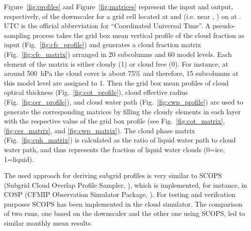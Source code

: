 Figure~\ref{fig:profiles} and Figure~\ref{fig:matrices} 
represent the input and output, respectively, of the downscaler
for a grid cell located at {\longitude} and {\latitude} (i.e. near {\gccity}, {\gcland})
on {\gcdate} at {\gchour}. UTC is the official abbreviation for ``Coordinated Universal Time''.
A pseudo-sampling process takes the grid box mean vertical profile of the cloud fraction as input 
(Fig.~\ref{fig:cfc_profile}) and generates a cloud fraction matrix 
(Fig.~\ref{fig:cfc_matrix}) arranged in 20 subcolumns and 60 model levels.
Each element of the matrix is either cloudy (1) or cloud free (0).
For instance, at around 500~hPa the cloud cover is about 75\% and therefore,
15 subcolumns at this model level are assigned to 1.
Then the grid box mean profiles of cloud optical thickness (Fig.~\ref{fig:cot_profile}),
cloud effective radius (Fig.~\ref{fig:cer_profile}), 
and cloud water path (Fig.~\ref{fig:cwp_profile}) are used
to generate the corresponding matrices by filling the cloudy elements
in each layer with the respective value of the grid box profile 
(see Fig.~\ref{fig:cot_matrix}, \ref{fig:cer_matrix}, and \ref{fig:cwp_matrix}).
The cloud phase matrix (Fig.~\ref{fig:cph_matrix}) is calculated as the ratio
of liquid water path to cloud water path, and thus represents 
the fraction of liquid water clouds (0=ice, 1=liquid).

The used approach for deriving subgrid profiles is very similar to
SCOPS (Subgrid Cloud Overlap Profile Sampler, \citet{Webb2001}), which is implemented, 
for instance, in COSP (CFMIP Observation Simulator Package, \cite{Bodas2011}).
For testing and verifcation purposes SCOPS has been implemented in the cloud simulator. 
The comparison of two runs, one based on the downscaler and the other one using SCOPS,
led to similar monthly mean results.



